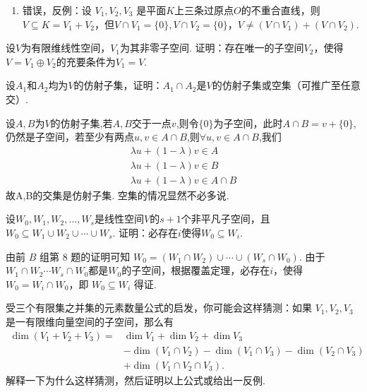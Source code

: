\begin{exercise}
\begin{exgroup}
\begin{answer}
\begin{enumerate}
              \item 错误，反例：设 $V_1,V_2,V_3$ 是平面$K$上三条过原点$O$的不重合直线，则$V\subseteq K=V_1+V_2$，但$V\cap V_1=\{0\},V\cap V_2=\{0\}$，$V\ne (V\cap V_1)+(V\cap V_2)$.
          \end{enumerate}
        \end{answer}
        \item 设$V$为有限维线性空间，$V_1$为其非零子空间. 证明：存在唯一的子空间$V_2$，使得$V=V_1\oplus V_2$的充要条件为$V_1=V$.
        \begin{answer}

        \end{answer}

       \item 设$A_1$和$A_2$均为$V$的仿射子集，证明：$A_1\cap A_2$是$V$的仿射子集或空集（可推广至任意交）.
       \begin{answer}
        设$A,B$为$V$的仿射子集,若$A,B$交于一点$v$,则令$\{0\}$为子空间，此时$A \cap B = v+\{0\} $,仍然是子空间，若至少有两点$u,v \in A \cap B$,则$ \forall u,v \in A \cap B$,我们
        \begin{align*}
         \lambda u + (1-\lambda)v \in A \\
            \lambda u + (1-\lambda)v \in B\\
            \lambda u + (1-\lambda)v \in A \cap B
        \end{align*}
       故A,B的交集是仿射子集.
       空集的情况显然不必多说.
       \end{answer}
    \end{exgroup}

    \begin{exgroup}
        \item 设$W_0,W_1,W_2,\ldots,W_s$是线性空间$V$的$s+1$个非平凡子空间，且$W_0 \subseteq W_1 \cup W_2 \cup \cdots \cup W_s$. 证明：必存在$i$使得$W_0\subseteq W_i$.
        \begin{answer}
            由前 $B$ 组第 8 题的证明可知 $W_0=(W_1\cap W_2)\cup\cdots\cup(W_s\cap W_0)$. 由于$W_1\cap W_2\cdots W_s\cap W_0$都是$W_0$的子空间，根据覆盖定理，必存在$i$，使得$W_0=W_i\cap W_0$，即 $W_0\subseteq W_i$ 得证.
        \end{answer}

        \item 受三个有限集之并集的元素数量公式的启发，你可能会这样猜测：如果 $V_1,V_2,V_3$ 是一有限维向量空间的子空间，那么有
        \begin{align*}
            \dim(V_1+V_2+V_3) ={} &\dim V_1+\dim V_2+\dim V_3 \\
            &-\dim(V_1\cap V_2)-\dim(V_1\cap V_3)-\dim(V_2\cap V_3) \\
            &+\dim(V_1\cap V_2\cap V_3).
        \end{align*}
        解释一下为什么这样猜测，然后证明以上公式或给出一反例.
        \begin{answer}


\end{answer}
\end{exgroup}
\end{exercise}
